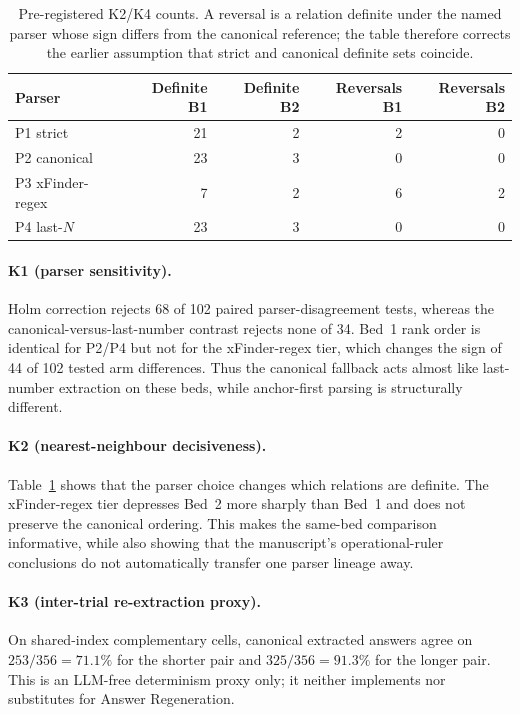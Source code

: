 \documentclass{article}
\begin{document}
\begin{table}[!htbp]
\centering\footnotesize
\setlength{\tabcolsep}{5pt}
\begin{tabular}{@{}lrrrr@{}}
\toprule
Parser & Definite B1 & Definite B2 & Reversals B1 & Reversals B2 \\
\midrule
\textsc{P1} strict & 21 & 2 & 2 & 0 \\
\textsc{P2} canonical & 23 & 3 & 0 & 0 \\
\textsc{P3} xFinder-regex & 7 & 2 & 6 & 2 \\
\textsc{P4} last-$N$ & 23 & 3 & 0 & 0 \\
\bottomrule
\end{tabular}
\caption{Pre-registered K2/K4 counts.  A reversal is a relation definite
under the named parser whose sign differs from the canonical reference; the
table therefore corrects the earlier assumption that strict and canonical
definite sets coincide.}
\label{tab:parser-verdicts}
\end{table}

\paragraph{K1 (parser sensitivity).}
Holm correction rejects 68 of 102 paired parser-disagreement tests, whereas
the canonical-versus-last-number contrast rejects none of 34.  Bed~1 rank
order is identical for \textsc{P2}/\textsc{P4} but not for the xFinder-regex
tier, which changes the sign of 44 of 102 tested arm differences.  Thus the
canonical fallback acts almost like last-number extraction on these beds,
while anchor-first parsing is structurally different.

\paragraph{K2 (nearest-neighbour decisiveness).}
Table~\ref{tab:parser-verdicts} shows that the parser choice changes which
relations are definite.  The xFinder-regex tier depresses Bed~2 more sharply
than Bed~1 and does not preserve the canonical ordering.  This makes the
same-bed comparison informative, while also showing that the manuscript's
operational-ruler conclusions do not automatically transfer one parser
lineage away.

\paragraph{K3 (inter-trial re-extraction proxy).}
On shared-index complementary cells, canonical extracted answers agree on
$253/356=71.1\%$ for the shorter pair and $325/356=91.3\%$ for the longer
pair.  This is an LLM-free determinism proxy only; it neither implements nor
substitutes for Answer Regeneration.
\end{document}
